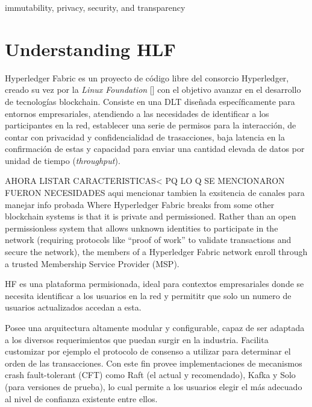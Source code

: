 immutability, privacy, security, and transparency


\section{Understanding HLF}

Hyperledger Fabric es un proyecto de c\'odigo libre del consorcio Hyperledger, creado su vez por la \emph{Linux Foundation} [\cite{linuxFoundation}] con el objetivo avanzar en el desarrollo de tecnolog\'ias blockchain. Consiste en una DLT dise\~nada espec\'ificamente para entornos empresariales, atendiendo a las necesidades de identificar a los participantes en la red, establecer una serie de permisos para la interacci\'on, de contar con privacidad y confidencialidad de trasacciones, baja latencia en la confirmaci\'on de estas y capacidad para enviar una cantidad elevada de datos por unidad de tiempo (\emph{throughput}).

AHORA LISTAR CARACTERISTICAS< PQ LO Q SE MENCIONARON FUERON NECESIDADES
aqui mencionar tambien la exsitencia de canales para manejar info probada
Where Hyperledger Fabric breaks from some other blockchain systems is that it is private and permissioned. Rather than an open permissionless system that allows unknown identities to participate in the network (requiring protocols like “proof of work” to validate transactions and secure the network), the members of a Hyperledger Fabric network enroll through a trusted Membership Service Provider (MSP).

HF es una plataforma permisionada, ideal para contextos empresariales donde se necesita identificar a los usuarios en la red y permititr que solo un numero de usuarios
actualizados accedan a esta. 

Posee una arquitectura altamente modular y configurable, capaz de ser adaptada a los diversos requerimientos que puedan surgir en la industria. Facilita customizar por ejemplo el protocolo de consenso a utilizar para determinar el orden de las transacciones. Con este fin provee implementaciones de mecanismos crash fault-tolerant (CFT) como Raft (el actual y recomendado), Kafka y Solo (para versiones de prueba), lo cual permite a los usuarios elegir el m\'as adecuado al nivel de confianza existente entre ellos.

